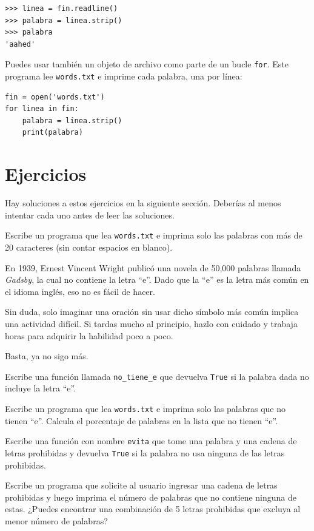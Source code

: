 \documentclass[10pt]{book}
\begin{document}
\begin{verbatim}
>>> linea = fin.readline()
>>> palabra = linea.strip()
>>> palabra
'aahed'
\end{verbatim}
%
Puedes usar también un objeto de archivo como parte de un bucle {\tt for}.
Este programa lee {\tt words.txt} e imprime cada palabra, una
por línea:

\begin{verbatim}
fin = open('words.txt')
for linea in fin:
    palabra = linea.strip()
    print(palabra)
\end{verbatim}
%

\section{Ejercicios}

Hay soluciones a estos ejercicios en la siguiente sección.
Deberías al menos intentar cada uno antes de leer las soluciones.

\begin{exercise}
Escribe un programa que lea {\tt words.txt} e imprima solo las
palabras con más de 20 caracteres (sin contar espacios en blanco).

\end{exercise}

\begin{exercise}

En 1939, Ernest Vincent Wright publicó una novela de 50,000 palabras llamada
{\em Gadsby}, la cual no contiene la letra ``e''.  Dado que la ``e'' es
la letra más común en el idioma inglés, eso no es fácil de hacer.

Sin duda, solo imaginar una oración sin usar dicho símbolo más común
implica una actividad difícil.  Si tardas mucho al principio, hazlo con cuidado
y trabaja horas para adquirir la habilidad poco a poco.

Basta, ya no sigo más.

Escribe una función llamada \verb"no_tiene_e" que devuelva {\tt True} si
la palabra dada no incluye la letra ``e''.

Escribe un programa que lea {\tt words.txt} e imprima solo las palabras
que no tienen ``e''.  Calcula el porcentaje de palabras en la lista
que no tienen ``e''.

\end{exercise}


\begin{exercise}

Escribe una función con nombre {\tt evita}
que tome una palabra y una cadena de letras prohibidas y
devuelva {\tt True} si la palabra no usa ninguna de las letras
prohibidas.

Escribe un programa que solicite al usuario ingresar una cadena
de letras prohibidas y luego imprima el número de palabras que
no contiene ninguna de estas.
¿Puedes encontrar una combinación de 5 letras prohibidas que
excluya al menor número de palabras?

\end{exercise}
\end{document}
